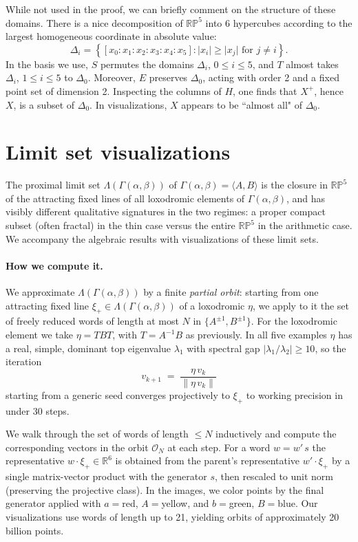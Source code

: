 \documentclass[11pt]{article}
\newcommand{\RR}{\mathbb{R}}
\newcommand{\PP}{\mathbb{P}}
\newcommand{\Gammaab}{\Gamma(\alpha,\beta)}
\newcommand{\abs}[1]{\lvert #1 \rvert}
\begin{document}
While not used in the proof, we can briefly comment on the structure of these domains.
There is a nice decomposition of $\RR\PP^5$ into $6$ hypercubes according to the largest homogeneous coordinate in absolute value:
    \[ \Delta_i = \left\{ [x_0:x_1:x_2:x_3:x_4:x_5] : \abs{ x_i } \ge \abs{x_j} \text{ for } j \ne i \right\} .\]
In the basis we use, $S$ permutes the domains $\Delta_i$, $0 \le i \le 5$, and $T$ almost takes $\Delta_i$, $1\le i \le 5$ to $\Delta_0$. 
Moreover, $E$ preserves $\Delta_0$, acting with order 2 and a fixed point set of dimension 2. 
Inspecting the columns of $H$, one finds that $X^+$, hence $X$, is a subset of $\Delta_0$. 
In visualizations, $X$ appears to be ``almost all" of $\Delta_0$. 


\section{Limit set visualizations}\label{sec:limitset}


The proximal limit set $\Lambda(\Gammaab)$ of $\Gammaab = \langle A, B \rangle$
is the closure in $\mathbb{RP}^5$ of the attracting fixed lines of all
loxodromic elements of $\Gammaab$, and has visibly different qualitative
signatures in the two regimes: a proper compact subset (often fractal) in
the thin case versus the entire $\mathbb{RP}^5$ in the arithmetic case.  
We accompany the algebraic results with visualizations of these limit sets.%


\paragraph{How we compute it.}

We approximate $\Lambda(\Gammaab)$ by a finite \emph{partial
orbit}: starting from one attracting fixed line $\xi_+ \in \Lambda(\Gammaab)$ of a loxodromic $\eta$, we
apply to it the set of freely reduced words of length at most $N$ in
$\{A^{\pm 1}, B^{\pm 1}\}$.  
For the loxodromic element we take $\eta = TBT$, with $T = A^{-1}B$ as previously.  In all five examples $\eta$ has a real, simple,
dominant top eigenvalue $\lambda_1$ with spectral gap $|\lambda_1/\lambda_2| \geq 10$,
so the iteration
\[
  v_{k+1} \;=\; \frac{\eta\, v_k}{\|\eta\, v_k\|}
\]
starting from a generic seed converges projectively to $\xi_+$ to working
precision in under $30$ steps.

We walk through the set of words of length $\leq N$ inductively and compute
the corresponding vectors in the orbit $\mathcal{O}_N$ at each step. For a word
$w = w'\, s$ the representative $w \cdot \xi_+ \in \mathbb{R}^6$ is
obtained from the parent's representative $w' \cdot \xi_+$ by a single
matrix-vector product with the generator $s$, then rescaled to unit norm
(preserving the projective class). 
In the images, we color points by the final generator applied with $a=$red, $A=$yellow, and $b=$green, $B=$blue.
Our visualizations use words of length up to 21, yielding orbits of approximately 20 billion points.  
\end{document}
